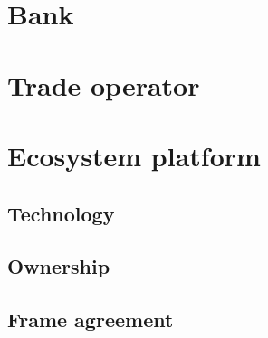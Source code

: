 \section{Bank}
\label{protect_bank}

\section{Trade operator}
\label{protect_trade_operatot}

\section{Ecosystem platform}
\label{protect_ecosystem_platform}

\subsection{Technology}
\label{protect_technology}

\subsection{Ownership}
\label{protect_ownership}

\subsection{Frame agreement}
\label{protect_frame_agreement}


